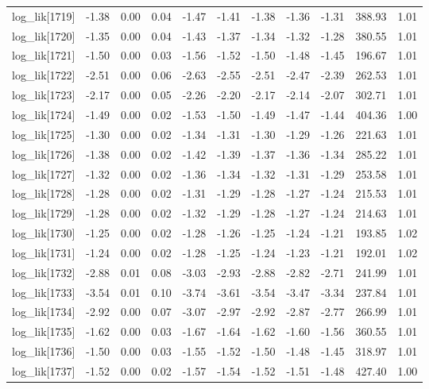 \begin{table}[ht]
\begin{tabular}{rrrrrrrrrrr}
  log\_lik[1719] & -1.38 & 0.00 & 0.04 & -1.47 & -1.41 & -1.38 & -1.36 & -1.31 & 388.93 & 1.01 \\ 
  log\_lik[1720] & -1.35 & 0.00 & 0.04 & -1.43 & -1.37 & -1.34 & -1.32 & -1.28 & 380.55 & 1.01 \\ 
  log\_lik[1721] & -1.50 & 0.00 & 0.03 & -1.56 & -1.52 & -1.50 & -1.48 & -1.45 & 196.67 & 1.01 \\ 
  log\_lik[1722] & -2.51 & 0.00 & 0.06 & -2.63 & -2.55 & -2.51 & -2.47 & -2.39 & 262.53 & 1.01 \\ 
  log\_lik[1723] & -2.17 & 0.00 & 0.05 & -2.26 & -2.20 & -2.17 & -2.14 & -2.07 & 302.71 & 1.01 \\ 
  log\_lik[1724] & -1.49 & 0.00 & 0.02 & -1.53 & -1.50 & -1.49 & -1.47 & -1.44 & 404.36 & 1.00 \\ 
  log\_lik[1725] & -1.30 & 0.00 & 0.02 & -1.34 & -1.31 & -1.30 & -1.29 & -1.26 & 221.63 & 1.01 \\ 
  log\_lik[1726] & -1.38 & 0.00 & 0.02 & -1.42 & -1.39 & -1.37 & -1.36 & -1.34 & 285.22 & 1.01 \\ 
  log\_lik[1727] & -1.32 & 0.00 & 0.02 & -1.36 & -1.34 & -1.32 & -1.31 & -1.29 & 253.58 & 1.01 \\ 
  log\_lik[1728] & -1.28 & 0.00 & 0.02 & -1.31 & -1.29 & -1.28 & -1.27 & -1.24 & 215.53 & 1.01 \\ 
  log\_lik[1729] & -1.28 & 0.00 & 0.02 & -1.32 & -1.29 & -1.28 & -1.27 & -1.24 & 214.63 & 1.01 \\ 
  log\_lik[1730] & -1.25 & 0.00 & 0.02 & -1.28 & -1.26 & -1.25 & -1.24 & -1.21 & 193.85 & 1.02 \\ 
  log\_lik[1731] & -1.24 & 0.00 & 0.02 & -1.28 & -1.25 & -1.24 & -1.23 & -1.21 & 192.01 & 1.02 \\ 
  log\_lik[1732] & -2.88 & 0.01 & 0.08 & -3.03 & -2.93 & -2.88 & -2.82 & -2.71 & 241.99 & 1.01 \\ 
  log\_lik[1733] & -3.54 & 0.01 & 0.10 & -3.74 & -3.61 & -3.54 & -3.47 & -3.34 & 237.84 & 1.01 \\ 
  log\_lik[1734] & -2.92 & 0.00 & 0.07 & -3.07 & -2.97 & -2.92 & -2.87 & -2.77 & 266.99 & 1.01 \\ 
  log\_lik[1735] & -1.62 & 0.00 & 0.03 & -1.67 & -1.64 & -1.62 & -1.60 & -1.56 & 360.55 & 1.01 \\ 
  log\_lik[1736] & -1.50 & 0.00 & 0.03 & -1.55 & -1.52 & -1.50 & -1.48 & -1.45 & 318.97 & 1.01 \\ 
  log\_lik[1737] & -1.52 & 0.00 & 0.02 & -1.57 & -1.54 & -1.52 & -1.51 & -1.48 & 427.40 & 1.00 \\ 

\end{tabular}
\end{table}
